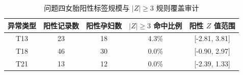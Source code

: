 \begin{table}[!htbp]
  \centering
  \caption{问题四女胎阳性标签规模与 $|Z|\geq 3$ 规则覆盖审计}
  \label{tab:a5}
  \small
  \begin{tabular}{@{}ccccc@{}}
    \toprule
    异常类型 & 阳性记录数 & 阳性孕妇数 & $|Z|\geq 3$ 命中比例 & 阳性 $Z$ 值范围 \\
    \midrule
    T13 & 23 & 18 & 4.3\% & [-2.81, 3.81] \\
    T18 & 46 & 30 & 0.0\% & [-0.90, 2.97] \\
    T21 & 13 & 12 & 0.0\% & [-2.39, 1.33] \\
    \bottomrule
  \end{tabular}
\end{table}
